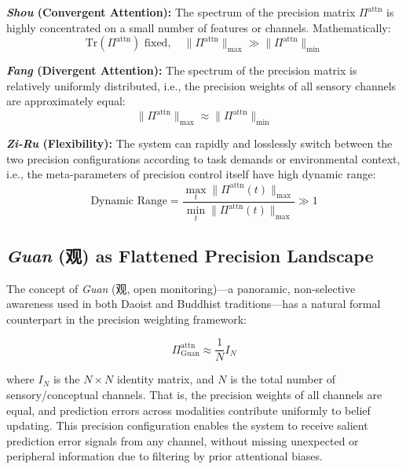 \documentclass[11pt,a4paper]{article}
\begin{document}
\textbf{\textit{Shou} (Convergent Attention):} The spectrum of the precision matrix $\Pi^{\text{attn}}$ is highly concentrated on a small number of features or channels. Mathematically:
\begin{equation}
\text{Tr}(\Pi^{\text{attn}}) \text{ fixed}, \quad \|\Pi^{\text{attn}}\|_{\text{max}} \gg \|\Pi^{\text{attn}}\|_{\text{min}}
\label{eq:shou}
\end{equation}

\textbf{\textit{Fang} (Divergent Attention):} The spectrum of the precision matrix is relatively uniformly distributed, i.e., the precision weights of all sensory channels are approximately equal:
\begin{equation}
\|\Pi^{\text{attn}}\|_{\text{max}} \approx \|\Pi^{\text{attn}}\|_{\text{min}}
\label{eq:fang}
\end{equation}

\textbf{\textit{Zi-Ru} (Flexibility):} The system can rapidly and losslessly switch between the two precision configurations according to task demands or environmental context, i.e., the meta-parameters of precision control itself have high dynamic range:
\begin{equation}
\text{Dynamic Range} = \frac{\max_t \|\Pi^{\text{attn}}(t)\|_{\text{max}}}{\min_t \|\Pi^{\text{attn}}(t)\|_{\text{max}}} \gg 1
\label{eq:ziru}
\end{equation}

\subsection{\textit{Guan} (观) as Flattened Precision Landscape}

The concept of \textit{Guan} (观, open monitoring)---a panoramic, non-selective awareness used in both Daoist and Buddhist traditions---has a natural formal counterpart in the precision weighting framework:

\begin{equation}
\Pi^{\text{attn}}_{\text{Guan}} \approx \frac{1}{N} I_N
\label{eq:guan}
\end{equation}

where $I_N$ is the $N \times N$ identity matrix, and $N$ is the total number of sensory/conceptual channels. That is, the precision weights of all channels are equal, and prediction errors across modalities contribute uniformly to belief updating. This precision configuration enables the system to receive salient prediction error signals from any channel, without missing unexpected or peripheral information due to filtering by prior attentional biases.
\end{document}
